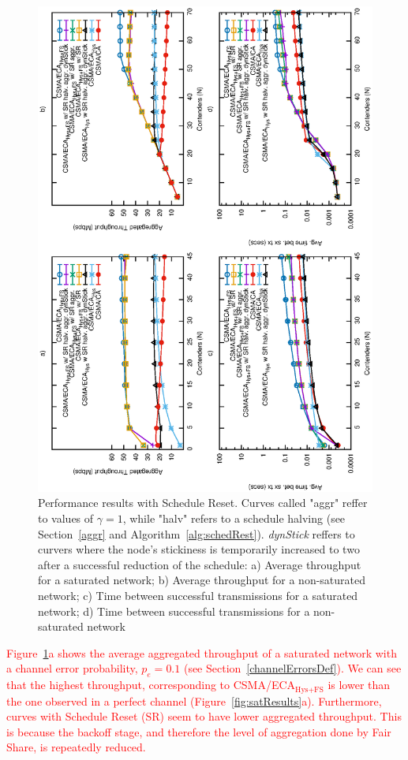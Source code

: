 	\begin{figure}[tb]
		\centering
		\includegraphics[width=0.65\linewidth,angle=-90]{figures/tonFigs/schedReset-combined.eps}
		\caption{Performance results with Schedule Reset. Curves called "aggr" reffer to values of $\gamma=1$, while "halv" refers to a schedule halving (see Section~\ref{aggr} and Algorithm~\ref{alg:schedRest}). \emph{dynStick} reffers to curvers where the node's stickiness is temporarily increased to two after a successful reduction of the schedule: a) Average throughput for a saturated network; b) Average throughput for a non-saturated network; c) Time between successful transmissions for a saturated network; d) Time between successful transmissions for a non-saturated network}
		\label{fig:SchedResetResults}
	\end{figure}
	
	\textcolor{red}{Figure~\ref{fig:SchedResetResults}a shows the average aggregated throughput of a saturated network with a channel error probability, $p_e=0.1$ (see Section~\ref{channelErrorsDef}). We can see that the highest throughput, corresponding to CSMA/ECA$_{\text{Hys+FS}}$ is lower than the one observed in a perfect channel (Figure~\ref{fig:satResults}a). Furthermore, curves with Schedule Reset (SR) seem to have lower aggregated throughput. This is because the backoff stage, and therefore the level of aggregation done by Fair Share, is repeatedly reduced.}
	
